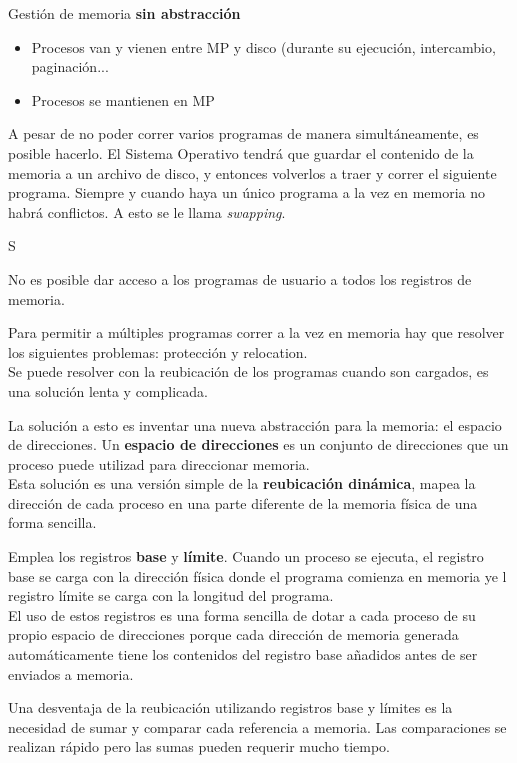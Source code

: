 \documentclass[10pt,portrait, twocolumn]{article}
\begin{document}
Gestión de memoria \textbf{sin abstracción}

	\begin{itemize}
	\item Procesos van y vienen entre MP y disco (durante su ejecución, intercambio, paginación...
	\item Procesos se mantienen en MP
	\end{itemize}
	
A pesar de no poder correr varios programas de manera simultáneamente, es posible hacerlo. El Sistema Operativo tendrá que guardar el contenido de la memoria a un archivo de disco, y entonces volverlos a traer y correr el siguiente programa. Siempre y cuando haya un único programa a la vez en memoria no habrá conflictos. A esto se le llama \textit{swapping}.

S

No es posible dar acceso a los programas de usuario a todos los registros de memoria.

	\quad Para permitir a múltiples programas correr a la vez en memoria hay que resolver los siguientes problemas: protección y relocation.\\
	
Se puede resolver con la reubicación de los programas cuando son cargados, es una solución lenta y complicada.
	
	\quad La solución a esto es inventar una nueva abstracción para la memoria: el espacio de direcciones. Un \textbf{espacio de direcciones} es un conjunto de direcciones que un proceso puede utilizad para direccionar memoria. \\
	
Esta solución es una versión simple de la \textbf{reubicación dinámica}, mapea la dirección de cada proceso en una parte diferente de la memoria física de una forma sencilla.

	\quad Emplea los registros \textbf{base} y \textbf{límite}. Cuando un proceso se ejecuta, el registro base se carga con la dirección física donde el programa comienza en memoria ye l registro límite se carga con la longitud del programa.\\
	
El uso de estos registros es una forma sencilla de dotar a cada proceso de su propio espacio de direcciones porque cada dirección de memoria generada automáticamente tiene los contenidos del registro base añadidos antes de ser enviados a memoria.

	\quad Una desventaja de la reubicación utilizando registros base y límites es la necesidad de sumar y comparar cada referencia a memoria. Las comparaciones se realizan rápido pero las sumas pueden requerir mucho tiempo.
	
\end{document}
